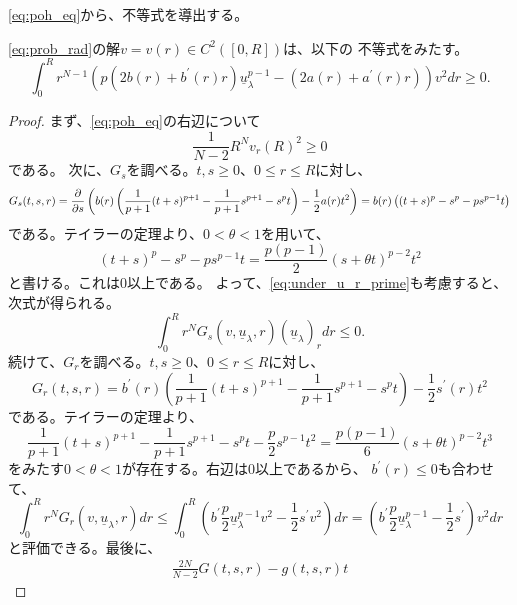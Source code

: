 \eqref{eq:poh_eq}から、不等式を導出する。

\begin{lem}
 \eqref{eq:prob_rad}の解$v = v(r) \in C^2([0, R])$は、以下の
 不等式をみたす。
 \begin{equation}
  \int_0^R r^{N-1} \left( p(2b(r) + b^\prime(r) r)
                    \underline{u}_\lambda^{p-1} 
                    - (2a(r) + a^\prime(r) r) \right) v^2 dr \geq 0.
  \label{eq:poh_ineq}
 \end{equation}
\end{lem}

\begin{proof}
 まず、\eqref{eq:poh_eq}の右辺について
 \begin{equation}
  \frac{1}{N-2} R^N v_r(R)^2 \geq 0 \label{eq:poh_ineq_0}
 \end{equation}
 である。
 次に、$G_s$を調べる。$t, s \geq 0$、$0 \leq r \leq R$に対し、
 \[
  G_s(t, s, r) = \frac{\partial }{\partial s} \left( b(r) \left( \frac{1}{p+1}
 (t+s)^{p+1} - \frac{1}{p+1}s^{p+1} - s^pt \right)
 - \frac{1}{2}a(r) t^2 \right) = b(r) \left( (t+s)^p - s^p -p s^{p-1}
 t \right)
 \]
 である。テイラーの定理より、$0 < \theta < 1$を用いて、
 \[
  (t+s)^p - s^p - ps^{p-1} t = \frac{p(p-1)}{2} (s + \theta t)^{p-2} t^2
 \]
 と書ける。これは$0$以上である。
 よって、\eqref{eq:under_u_r_prime}も考慮すると、次式が得られる。
 \begin{equation}
  \int_0^R r^N G_s(v, \underline{u}_\lambda, r)
   (\underline{u}_\lambda)_r dr \leq 0. \label{eq:poh_ineq_1}
 \end{equation}
 続けて、$G_r$を調べる。$t, s \geq 0$、$0 \leq r \leq R$に対し、
 \[
  G_r(t, s, r) = b^\prime(r) \left( \frac{1}{p+1} (t+s)^{p+1} -
 \frac{1}{p+1} s^{p+1} - s^{p} t \right) - \frac{1}{2} s^\prime(r) t^2
 \]
 である。テイラーの定理より、
 \[
  \frac{1}{p+1} (t+s)^{p+1} - \frac{1}{p+1} s^{p+1} -s^p t -
 \frac{p}{2} s^{p-1} t^2 = \frac{p(p-1)}{6} (s + \theta t)^{p-2} t^3
 \]
 をみたす$0 < \theta < 1$が存在する。右辺は$0$以上であるから、
 $b^\prime(r) \leq 0$も合わせて、
 \begin{equation}
  \int_0^R r^N G_r(v, \underline{u}_\lambda, r) dr \leq \int_0^R
   \left( b^\prime \frac{p}{2} \underline{u}_\lambda^{p-1} v^2 -
    \frac{1}{2} s^\prime v^2 \right)dr = 
   \left( b^\prime \frac{p}{2} \underline{u}_\lambda^{p-1} -
    \frac{1}{2} s^\prime \right) v^2 dr \label{eq:poh_ineq_2} 
 \end{equation}
 と評価できる。最後に、
 \begin{align*}
  \frac{2N}{N-2}G(t, s, r) - g(t, s, r)t 

\end{align*}
\end{proof}
